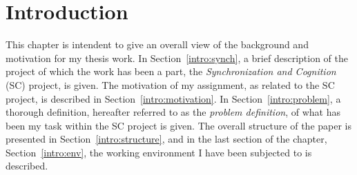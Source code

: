 
\cleardoublepage
\chapter{Introduction}
\label{intro}

This chapter is intendent to give an overall view of the background
and motivation for my thesis work.  In Section~\ref{intro:synch}, a
brief description of the project of which the work has been a part,
the {\em Synchronization and Cognition\/} (SC) project, is given.  The
motivation of my assignment, as related to the SC project, is
described in Section~\ref{intro:motivation}.  In
Section~\ref{intro:problem}, a thorough definition, hereafter referred
to as the {\em problem definition\/}, of what has been my task within
the SC project is given.  The overall structure of the paper is
presented in Section~\ref{intro:structure}, and in the last section of
the chapter, Section~\ref{intro:env}, the working environment I have
been subjected to is described.







